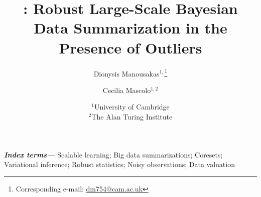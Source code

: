 \documentclass[a4paper,11pt]{article}
\providecommand{\keywords}[1]{\textbf{\textit{Index terms---}} #1}
\begin{document}
\title{\bcores: Robust Large-Scale Bayesian Data Summarization in the Presence of Outliers}
\author{Dionysis Manousakas$^{1,}$\thanks{Corresponding e-mail: \href{mailto:dm754@cam.ac.uk}{dm754@cam.ac.uk}} \and Cecilia Mascolo$^{1,2}$}
\date{%
		$^1$University of Cambridge\\%
		$^2$The Alan Turing Institute\\[2ex]%
}
\maketitle

\keywords{Scalable learning; Big data summarizations; Coresets; Variational inference; Robust statistics; Noisy observations; Data valuation}







\appendix
%


\clearpage

\end{document}
